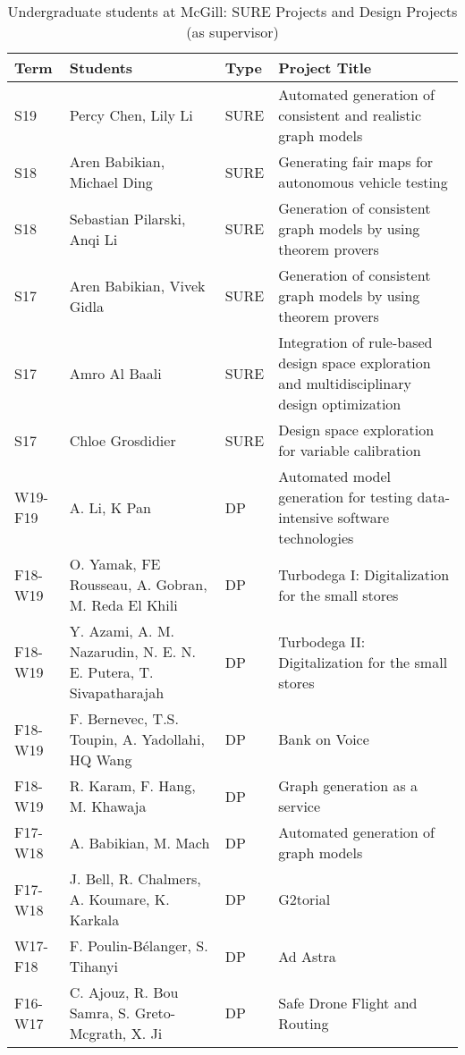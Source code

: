 \begin{table}[htb]
\footnotesize
\begin{tabular}{@{}lp{4cm}lp{10cm}@{}}
\toprule
\textbf{Term} & \textbf{Students} & \textbf{Type} & \textbf{Project Title} \\ \midrule
S19 & Percy Chen, Lily Li & SURE& Automated generation of consistent and realistic graph models\\
S18 & Aren Babikian, Michael Ding & SURE & Generating fair maps for autonomous vehicle testing\\
S18 & Sebastian Pilarski, Anqi Li& SURE & Generation of consistent graph models by using theorem provers\\
S17 & Aren Babikian, Vivek Gidla & SURE & Generation of consistent graph models by using theorem provers\\
S17 & Amro Al Baali & SURE & Integration of rule-based design space exploration and multidisciplinary design optimization\\
S17 & Chloe Grosdidier & SURE & Design space exploration for variable calibration\\ \midrule
W19-F19 & A. Li, K Pan & DP  & Automated model generation for testing data-intensive software technologies \\
F18-W19 & O. Yamak, FE Rousseau, A. Gobran, M. Reda El Khili & DP  & Turbodega I: Digitalization for the small stores\\
F18-W19 & Y. Azami, A. M. Nazarudin, N. E. N. E. Putera, T. Sivapatharajah & DP  & Turbodega II: Digitalization for the small stores\\
F18-W19 & F. Bernevec, T.S. Toupin, A. Yadollahi, HQ Wang & DP  & Bank on Voice \\
F18-W19 & R. Karam, F. Hang, M. Khawaja& DP  & Graph generation as a service\\
F17-W18 & A. Babikian, M. Mach & DP  & Automated generation of graph models\\
F17-W18 & J. Bell, R. Chalmers, A. Koumare, K. Karkala & DP & G2torial\\
W17-F18 & F. Poulin-B\'elanger, S. Tihanyi & DP  & Ad Astra\\
F16-W17 & C. Ajouz, R. Bou Samra, S. Greto-Mcgrath, X. Ji & DP  & Safe Drone Flight and Routing\\
\midrule
\bottomrule
\end{tabular}
\caption{Undergraduate students at McGill: SURE Projects and Design Projects (as supervisor)}
\label{tab:ug-supervised}
\end{table}

